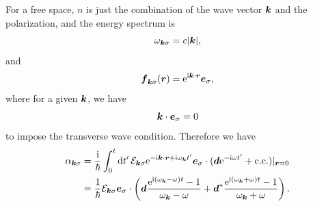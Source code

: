 \documentclass[hyperref, a4paper]{article}
\newcommand*{\ii}{\mathrm{i}}
\newcommand*{\ee}{\mathrm{e}}
\begin{document}
For a free space, $n$ is just the combination of the wave vector $\vb*{k}$ and the polarization, and the energy spectrum is
\begin{equation}
    \omega_{\vb*{k} \sigma} = c \abs{\vb*{k}},
\end{equation}
and 
\begin{equation}
    \vb*{f}_{\vb*{k} \sigma}(\vb*{r}) = \ee^{\ii \vb*{k} \cdot \vb*{r}} \vb*{e}_\sigma,
\end{equation}
where for a given $\vb*{k}$, we have
\begin{equation}
    \vb*{k} \cdot \vb*{e}_\sigma = 0
\end{equation}
to impose the transverse wave condition. Therefore we have
\begin{equation}
    \begin{aligned}
        \alpha_{\vb*{k} \sigma} &= \frac{\ii}{\hbar} \int_0^t \dd{t'} \mathcal{E}_{\vb*{k} \sigma} \ee^{- \ii \vb*{k} \cdot \vb*{r} + \ii \omega_{\vb*{k}} t'} \vb*{e}_\sigma \cdot (\vb*{d} \ee^{- \ii \omega t'} + \text{c.c.}) |_{\vb*{r} = 0} \\
        &= \frac{1}{\hbar} \mathcal{E}_{\vb*{k} \sigma} \vb*{e}_\sigma \cdot  \left( \vb*{d} \frac{\ee^{\ii (\omega_{\vb*{k}} - \omega) t} - 1}{\omega_{\vb*{k}} - \omega} + \vb*{d}^* \frac{\ee^{\ii (\omega_{\vb*{k}} + \omega) t} - 1}{\omega_{\vb*{k}} + \omega} \right).
    \end{aligned}
    \label{eq:alpha-ksigma-plane}
\end{equation} 
\end{document}
